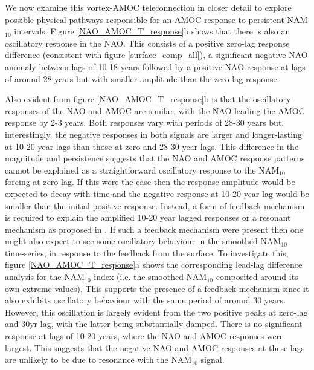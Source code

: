 We now examine this vortex-AMOC teleconnection in closer detail to explore possible physical pathways responsible for an AMOC response to persistent NAM$_{10}$ intervals. Figure \ref{NAO_AMOC_T_response}b shows that there is also an oscillatory response in the NAO. This consists of a positive zero-lag response difference (consistent with figure \ref{surface_comp_all}), a significant negative NAO anomaly between lags of 10-18 years followed by a positive NAO response at lags of around 28 years but with smaller amplitude than the zero-lag response. 

Also evident from figure \ref{NAO_AMOC_T_response}b is that the oscillatory responses of the NAO and AMOC are similar, with the NAO leading the AMOC response by 2-3 years. Both responses vary with periods of 28-30 years but, interestingly, the negative responses in both signals are larger and longer-lasting at 10-20 year lags than those at zero and 28-30 year lags. This difference in the magnitude and persistence suggests that the NAO and AMOC response patterns cannot be explained as a straightforward oscillatory response to the NAM$_{10}$ forcing at zero-lag. If this were the case then the response amplitude would be expected to decay with time and the negative response at 10-20 year lag would be smaller than the initial positive response.  Instead, a form of feedback mechanism is required to explain  the amplified 10-20 year lagged responses or a resonant mechanism as proposed in \cite{reichlerStratospheric2012b}. If such a feedback mechanism were present then one might also expect to see some oscillatory behaviour in the smoothed NAM$_{10}$ time-series, in response to the feedback from the surface. To investigate this, figure \ref{NAO_AMOC_T_response}a shows the corresponding lead-lag difference analysis for the NAM$_{10}$ index (i.e. the smoothed NAM$_{10}$ composited around its own extreme values). This supports the presence of a feedback mechanism since it also exhibits oscillatory behaviour with the same period of around 30 years. However, this oscillation is largely evident from the two positive peaks at zero-lag and 30yr-lag, with the latter being substantially damped. There is no significant response at lags of 10-20 years, where the NAO and AMOC responses were largest. This suggests that the negative NAO and AMOC responses at these lags are unlikely to be due to resonance with the NAM$_{10}$ signal. 



